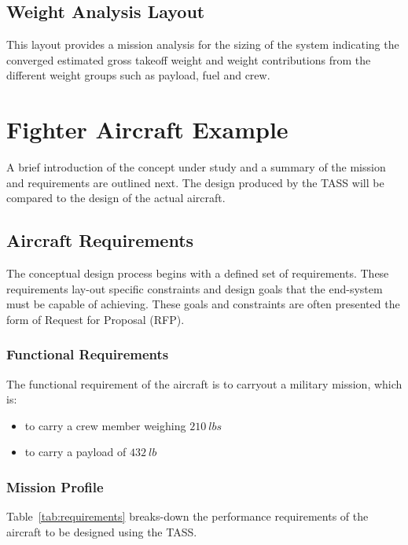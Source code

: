 \documentclass[pdftex,11pt,letter]{article}
\begin{document}
\subsection{Weight Analysis Layout}

This layout provides a mission analysis for the sizing of the system indicating the converged estimated gross takeoff weight and weight contributions from the different weight groups such as payload, fuel and crew.


\section{Fighter Aircraft Example}
A brief introduction of the concept under study and a summary of the mission and requirements are  outlined next\cite{MavrisNotes}. The design produced by the TASS will be compared to the design of the actual aircraft.

\subsection{Aircraft Requirements}\label{requirements}
 The conceptual design process begins with a defined set of requirements. These requirements lay-out specific constraints and design goals that the end-system must be capable of achieving.  These goals and constraints are often presented the form of Request for Proposal (RFP). %

\subsubsection{Functional Requirements}
The functional requirement of the aircraft is to carryout a military mission, which is:
\begin{itemize}
\item to carry a crew member weighing  $210~lbs$ 
\item to carry a payload of $432~lb$
\end{itemize}

\subsubsection{Mission Profile}
Table~\ref{tab:requirements} breaks-down the performance requirements of the aircraft to be designed using the TASS. 
\end{document}

